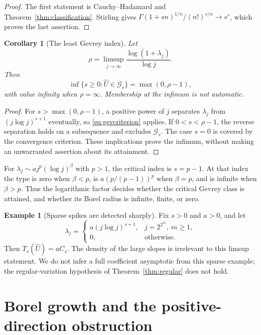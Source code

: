 \documentclass[11pt,a4paper]{article}
\numberwithin{equation}{section}
\newtheorem{corollary}[theorem]{Corollary}
\theoremstyle{definition}
\newtheorem{example}[theorem]{Example}
\theoremstyle{remark}
\newcommand{\Gev}{\mathcal G}
\newcommand{\Uhat}{\widehat U}
\begin{document}
\begin{proof}
The first statement is Cauchy--Hadamard and
Theorem~\ref{thm:classification}.  Stirling gives
$\Gamma(1+sn)^{1/n}/(n!)^{s/n}\to s^s$, which proves the last assertion.
\end{proof}

\begin{corollary}[The least Gevrey index]
\label{cor:index}
Let
\[
 \rho=\limsup_{j\to\infty}\frac{\log(1+\lambda_j)}{\log j}.
\]
Then
\begin{equation}
 \inf\{s\ge0:\Uhat\in\Gev_s\}=\max(0,\rho-1),
 \label{eq:index}
\end{equation}
with value infinity when $\rho=\infty$.  Membership at the infimum is
not automatic.
\end{corollary}

\begin{proof}
For $s>\max(0,\rho-1)$, a positive power of $j$ separates
$\lambda_j$ from $(j\log j)^{s+1}$ eventually, so
\eqref{eq:gevcriterion} applies.  If $0<s<\rho-1$, the reverse separation
holds on a subsequence and excludes $\Gev_s$.  The case $s=0$ is covered
by the convergence criterion.  These implications prove the infimum,
without making an unwarranted assertion about its attainment.
\end{proof}

For $\lambda_j\sim a j^p(\log j)^\beta$ with $p>1$, the critical index is
$s=p-1$.  At that index the type is zero when $\beta<p$, is
$a(p/(p-1))^p$ when $\beta=p$, and is infinite when $\beta>p$.
Thus the logarithmic factor decides whether the critical Gevrey class is
attained, and whether its Borel radius is infinite, finite, or zero.

\begin{example}[Sparse spikes are detected sharply]
Fix $s>0$ and $a>0$, and let
\[
 \lambda_j=\begin{cases}
 a(j\log j)^{s+1},&j=2^{2^m},\ m\ge1,\\
 0,&\text{otherwise}.
 \end{cases}
\]
Then $T_s(\Uhat)=aC_s$.  The density of the large slopes is irrelevant to
this limsup statement.  We do not infer a full coefficient asymptotic
from this sparse example; the regular-variation hypothesis of
Theorem~\ref{thm:regular} does not hold.
\end{example}

\section{Borel growth and the positive-direction obstruction}
\label{sec:borel}
\end{document}
